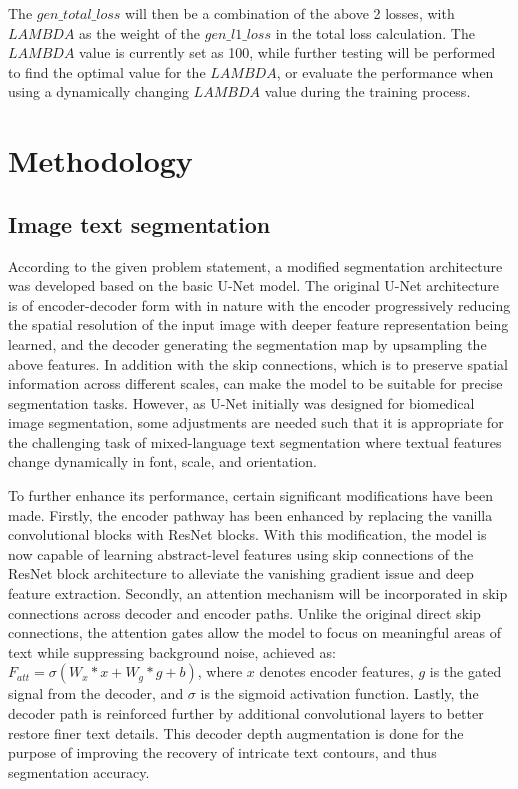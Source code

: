 \documentclass[10pt,twocolumn,letterpaper]{article}
\begin{document}
The $gen\_total\_loss$ will then be a combination of the above 2 losses, with $LAMBDA$ as the weight of the $gen\_l1\_loss$ in the total loss calculation. The $LAMBDA$
value is currently set as 100, while further testing will be performed to find the optimal value for the $LAMBDA$, or evaluate the performance when using a dynamically
changing $LAMBDA$ value during the training process.

\section{Methodology}

\subsection{Image text segmentation}

According to the given problem statement, a modified segmentation architecture was developed based on the basic U-Net model.
The original U-Net architecture is of encoder-decoder form with  in nature with the encoder progressively reducing the spatial resolution of the 
input image with deeper feature representation being learned, and the decoder generating the segmentation map by upsampling the above features.
In addition with the skip connections, which is to preserve spatial information across different scales, can make the model to be suitable
for precise segmentation tasks. However, as U-Net initially was designed for biomedical image segmentation, some adjustments are needed such that 
it is appropriate for the challenging task of mixed-language text segmentation where textual features change dynamically in font, scale, and orientation. 

To further enhance its performance, certain significant modifications have been made. Firstly, the encoder pathway has been enhanced by replacing 
the vanilla convolutional blocks with ResNet blocks. With this modification, the model is now capable of learning abstract-level features 
using skip connections of the ResNet block architecture to alleviate the vanishing gradient issue and deep feature extraction. 
Secondly, an attention mechanism will be incorporated in skip connections across decoder and encoder paths. Unlike the original direct skip connections, 
the attention gates allow the model to focus on meaningful areas of text while suppressing background noise, 
achieved as: $F_{att} = \sigma(W_x * x + W_g * g + b)$, where $x$ denotes encoder features, $g$ is the gated signal from the decoder, 
and $\sigma$ is the sigmoid activation function. 
Lastly, the decoder path is reinforced further by additional convolutional layers to better restore finer text details.
This decoder depth augmentation is done for the purpose of improving the recovery of intricate text contours, and thus segmentation accuracy.
\end{document}
